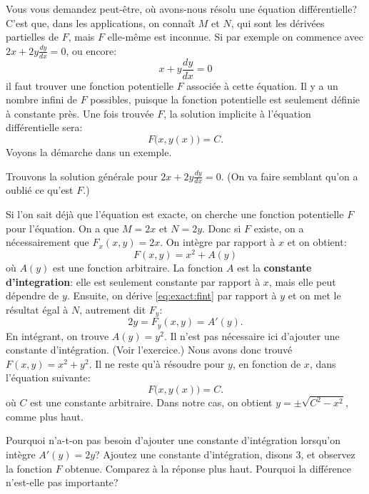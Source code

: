 Vous vous demandez peut-être, où avons-nous résolu une équation différentielle?
C'est que, dans les applications, on connaît $M$ et $N$, qui sont les dérivées partielles de $F$, mais $F$ elle-même est inconnue.
Si par exemple on commence avec $2x + 2y \frac{dy}{dx} = 0$, ou encore:
\begin{equation*}
	x + y \frac{dy}{dx} = 0
\end{equation*}
il faut trouver une fonction potentielle $F$ associée à cette équation.
Il y a un nombre infini de $F$ possibles, puisque la fonction potentielle est seulement définie à constante près.
Une fois trouvée $F$, la solution implicite à l'équation différentielle sera:
\begin{equation*}
	F\bigl(x,y(x)\bigr) = C.
\end{equation*}
Voyons la démarche dans un exemple.
\begin{example}
	Trouvons la solution générale pour 	$2x + 2y \frac{dy}{dx} = 0$.
	(On va faire semblant qu'on a oublié ce qu'est $F$.)

	Si l'on sait déjà que l'équation est exacte, on cherche une fonction potentielle $F$ pour l'équation.
	On a que $M = 2x$ et $N=2y$.
	Donc si $F$ existe, on a nécessairement que $F_x (x,y) = 2x$.
	On intègre par rapport à $x$ et on obtient:
	\begin{equation} \label{eq:exact:fint}
		F(x,y) = x^2 + A(y)
	\end{equation}
	où $A(y)$ est une fonction arbitraire.  La fonction $A$ est la {\bf constante d'integration}:
	elle est seulement constante par rapport à $x$, mais elle peut dépendre de $y$.
	Ensuite, on dérive \eqref{eq:exact:fint} par rapport à $y$ et on met le résultat égal à $N$, autrement dit $F_y$:
	\begin{equation*}
		2y = F_y (x,y) = A'(y) .
	\end{equation*}
	En intégrant, on trouve $A(y) = y^2$.  Il n'est pas nécessaire ici d'ajouter une constante d'intégration.
	(Voir l'exercice.)    Nous avons donc trouvé $F(x,y) = x^2+y^2$.
	Il ne reste qu'à résoudre pour $y$, en fonction de $x$, dans l'équation suivante:
	\begin{equation*}
		F\bigl(x,y(x)\bigr) = C .
	\end{equation*}
	où $C$ est une constante arbitraire. Dans notre cas, on obtient $y = \pm \sqrt{C^2-x^2}$, comme plus haut.
\end{example}

\begin{exercise}\label{exer:exact}
	Pourquoi n'a-t-on pas besoin d'ajouter une constante d'intégration lorsqu'on intègre $A'(y) = 2y$?
	Ajoutez une constante d'intégration, disons $3$, et observez la fonction $F$ obtenue.
	Comparez à la réponse plus haut.  Pourquoi la différence n'est-elle pas importante?
\end{exercise}

